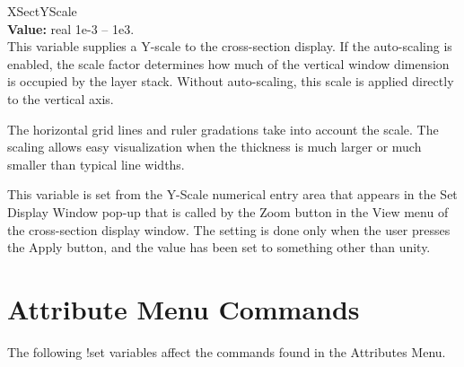 \begin{description}
\item{\et XSectYScale}\\
{\bf Value:} real 1e-3 -- 1e3.\\
This variable supplies a Y-scale to the cross-section display.  If the
auto-scaling is enabled, the scale factor determines how much of the
vertical window dimension is occupied by the layer stack.  Without
auto-scaling, this scale is applied directly to the vertical axis.

The horizontal grid lines and ruler gradations take into account the
scale.  The scaling allows easy visualization when the thickness is
much larger or much smaller than typical line widths.

This variable is set from the {\cb Y-Scale} numerical entry area that
appears in the {\cb Set Display Window} pop-up that is called by the
{\cb Zoom} button in the {\cb View} menu of the cross-section display
window.  The setting is done only when the user presses the {\cb
Apply} button, and the value has been set to something other than
unity.
\end{description}


\section{Attribute Menu Commands}

The following {\cb !set} variables affect the commands found in the
{\cb Attributes Menu}.

